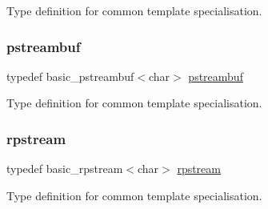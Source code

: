 Type definition for common template specialisation. 

\mbox{\label{namespaceredi_a4e3c818f3c5ee38281ff623f420fedb5}} 
\subsubsection{\texorpdfstring{pstreambuf}{pstreambuf}}
{\footnotesize\ttfamily typedef basic\+\_\+pstreambuf$<$char$>$ \mbox{\hyperlink{namespaceredi_a4e3c818f3c5ee38281ff623f420fedb5}{pstreambuf}}}



Type definition for common template specialisation. 

\mbox{\label{namespaceredi_a253a3457ef520e874ec8dadc1443d4a5}} 
\subsubsection{\texorpdfstring{rpstream}{rpstream}}
{\footnotesize\ttfamily typedef basic\+\_\+rpstream$<$char$>$ \mbox{\hyperlink{namespaceredi_a253a3457ef520e874ec8dadc1443d4a5}{rpstream}}}



Type definition for common template specialisation. 

